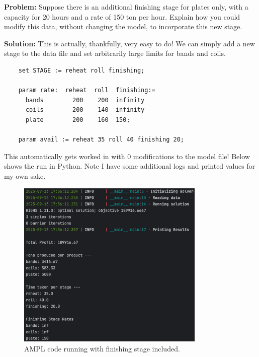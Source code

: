 \textbf{Problem:} Suppose there is an additional finishing stage for plates only, with a capacity for 20 hours and a rate of 150 ton per hour. Explain how you could modify this data, without changing the model, to incorporate this new stage. 

\noindent\textbf{Solution:} This is actually, thankfully, very easy to do! We can simply add a new stage to the data file and set arbitrarily large limits for bands and coils.

\begin{lstlisting}
	set STAGE := reheat roll finishing;

	param rate:  reheat  roll  finishing:=
	  bands        200    200  infinity
	  coils        200    140  infinity
	  plate        200    160  150;

	param avail := reheat 35 roll 40 finishing 20;
\end{lstlisting}

This automatically gets worked in with 0 modifications to the model file! Below shows the run in Python. Note I have some additional logs and printed values for my own sake.

\begin{figure}[htbp]
    \centering
    \includegraphics[width=0.8\textwidth]{../images/hw4-part-e-run.png}
    \caption{AMPL code running with finishing stage included.}
    \label{fig:your_label}
\end{figure}
